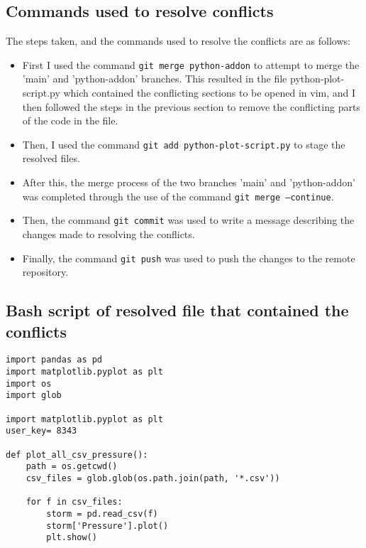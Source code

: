 \documentclass[]{article} %
\begin{document}
\subsection{Commands used to resolve conflicts}
The steps taken, and the commands used to resolve the conflicts are as follows:
\begin{itemize}
    \item First I used the command \texttt{git merge python-addon} to attempt to merge the 'main' and 'python-addon' branches. This resulted in the file python-plot-script.py which contained the conflicting sections to be opened in vim, and I then followed the steps in the previous section to remove the conflicting parts of the code in the file.
    \item Then, I used the command \texttt{git add python-plot-script.py} to stage the resolved files.
    \item After this, the merge process of the two branches 'main' and 'python-addon' was completed through the use of the command \texttt{git merge --continue}.
    \item Then, the command \texttt{git commit} was used to write a message describing the changes made to resolving the conflicts.
    \item Finally, the command \texttt{git push} was used to push the changes to the remote repository.
\end{itemize}
\newpage
\subsection{Bash script of resolved file that contained the conflicts\\}
\begin{verbatim}
import pandas as pd
import matplotlib.pyplot as plt
import os
import glob

import matplotlib.pyplot as plt
user_key= 8343

def plot_all_csv_pressure():
    path = os.getcwd()
    csv_files = glob.glob(os.path.join(path, '*.csv'))
    
    for f in csv_files:
        storm = pd.read_csv(f)
        storm['Pressure'].plot()
        plt.show()
\end{verbatim}
\begin{figure}[htbp]
  \captionsetup{justification=centering}
\end{figure}
\end{document}
